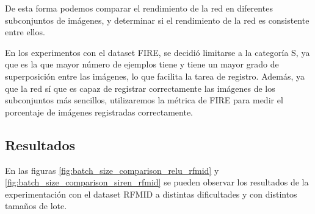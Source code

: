 De esta forma podemos comparar el rendimiento de la red en diferentes subconjuntos de imágenes, y determinar si el rendimiento de la red es consistente entre ellos.

En los experimentos con el dataset FIRE, se decidió limitarse a la categoría S, ya que es la que mayor número de ejemplos tiene y tiene un mayor grado de superposición entre las imágenes, lo que facilita la tarea de registro.
Además, ya que la red sí que es capaz de registrar correctamente las imágenes de los subconjuntos más sencillos, utilizaremos la métrica de FIRE para medir el porcentaje de imágenes registradas correctamente.

\subsection{Resultados}
\label{subsec:Resultados-batchsize}

En las figuras \ref{fig:batch_size_comparison_relu_rfmid} y \ref{fig:batch_size_comparison_siren_rfmid} se pueden observar los resultados de la experimentación con el dataset RFMID a distintas dificultades y con distintos tamaños de lote.

